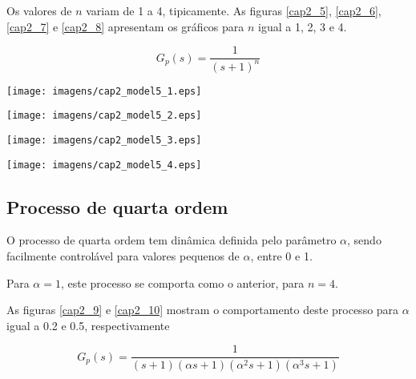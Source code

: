     Os valores de $n$ variam de 1 a 4, tipicamente. As figuras \ref{cap2_5},
    \ref{cap2_6}, \ref{cap2_7} e \ref{cap2_8} apresentam os gráficos para
    $n$ igual a 1, 2, 3 e 4.
    
    \begin{equation}
        G_p(s) = \frac{1}{(s+1)^n}
    \end{equation}

    \begin{center}
        \texttt{[image: imagens/cap2\_model5\_1.eps]}
        \label{cap2_5}
    \end{center}
    
    \begin{center}
        \texttt{[image: imagens/cap2\_model5\_2.eps]}
        \label{cap2_6}
    \end{center}
    
    \begin{center}
        \texttt{[image: imagens/cap2\_model5\_3.eps]}
        \label{cap2_7}
    \end{center}
    
    \begin{center}
        \texttt{[image: imagens/cap2\_model5\_4.eps]}
        \label{cap2_8}
    \end{center}

\subsection{Processo de quarta ordem}
    
    O processo de quarta ordem tem dinâmica definida pelo parâmetro $\alpha$,
    sendo facilmente controlável para valores pequenos de $\alpha$, entre 0 e 1.
    
    Para $\alpha = 1$, este processo se comporta como o anterior, para $n = 4$.
    
    As figuras \ref{cap2_9} e \ref{cap2_10} mostram o comportamento deste
    processo para $\alpha$ igual a 0.2 e 0.5, respectivamente
    
    \begin{equation}
        G_p(s) = \frac{1}{(s+1)(\alpha s+1)(\alpha ^2 s+1)(\alpha ^3 s+1)}
    \end{equation}


